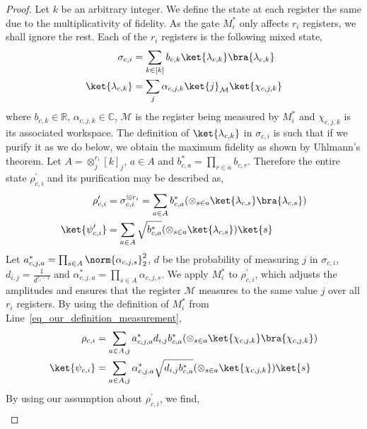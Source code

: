 \documentclass[10pt,a4paper]{article}
\newcommand{\parallelregisters}[0]{\ensuremath{r_i}\xspace}
\begin{document}
\begin{proof}
    Let $k$ be an arbitrary integer. We define the state at each register the same due to the multiplicativity of fidelity.
    As the gate $M^*_i$ only affects \parallelregisters registers, we shall ignore the rest. Each of the \parallelregisters registers is the following mixed state,
    \begin{align*}
        \sigma_{c,i} &= \sum_{k\in [k]} b_{c,k} \ket{\lambda_{c,k}}\bra{\lambda_{c,k}}\\
        \ket{\lambda_{c,k}} &= \sum_j \alpha_{c,j, k} \ket{j}_{\mathcal{M}}\ket{\chi_{c,j,k}}
    \end{align*}
    where $b_{c,k}\in \mathbb{R}$, $\alpha_{c,j,k}\in \mathbb{C}$, $\mathcal{M}$ is the register being measured by $M_i^*$ and $\chi_{c,j,k}$ is its associated workspace.
    The definition of $\ket{\lambda_{c,k}}$ in $\sigma_{c,i}$ is such that if we purify it as we do below, we obtain the maximum fidelity as shown by Uhlmann's theorem.
    Let $A = \otimes_j^{\parallelregisters} [k]_j$, $a\in A$ and $b^*_{c,a} = \prod_{r\in a} b_{c,r}$.
    Therefore the entire state $\rho^\prime_{c, i}$ and its purification may be described as,
    \begin{align*}
        \rho^\prime_{c, i} &= \sigma_{c,i}^{\otimes \parallelregisters} = \sum_{a\in A} b^*_{c,a} (\otimes_{s\in a} \ket{\lambda_{c,s}}\bra{\lambda_{c,s}}) \\
        \ket{\psi^\prime_{c,i}} &= \sum_{a\in A} \sqrt{b^*_{c,a}} (\otimes_{s\in a} \ket{\lambda_{c,s}})\ket{s}
    \end{align*}
    Let $a^*_{c,j,a} = \prod_{s\in A} \norm{\alpha_{c, j, s}}_2^2$, $d$ be the probability of measuring $j$ in $\sigma_{c,i}$, $d_{i,j}=\frac{1}{d^{\parallelregisters - 1}}$ and $\alpha^*_{c,j,a} = \prod_{s\in A} \alpha_{c,j,s}$.
    We apply $M^*_i$ to $\rho^\prime_{c, i}$, which adjusts the amplitudes and ensures that the register $\mathcal{M}$ measures to the same value $j$ over all $r_i$ registers. By using the definition of $M^*_i$ from Line~\ref{eq_our_definition_measurement},
    \begin{align*}
        \rho_{c,i} &= \sum_{a\in A, j} a^*_{c,j,a} d_{i,j} b^*_{c,a} (\otimes_{s\in a} \ket{\chi_{c,j,k}}\bra{\chi_{c,j,k}}) \\
        \ket{\psi_{c,i}} &= \sum_{a\in A, j} \alpha^*_{c,j,a} \sqrt{d_{i,j}b^*_{c,a}} (\otimes_{s\in a} \ket{\chi_{c,j,k}})\ket{s}
    \end{align*}
    By using our assumption about $\rho^\prime_{c, i}$, we find,
    \begin{align}

\end{align}
\end{proof}
\end{document}
